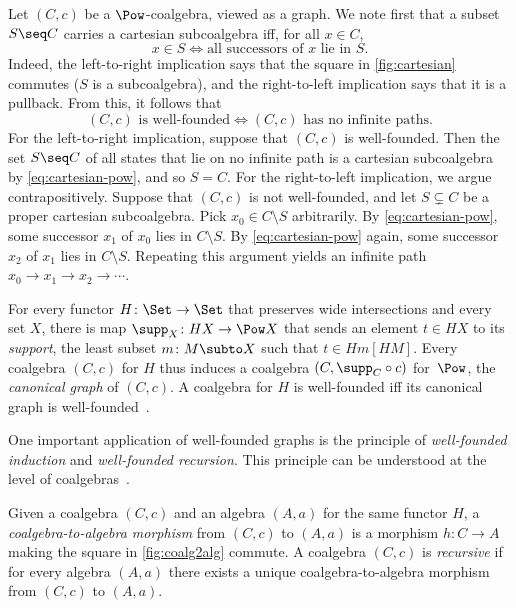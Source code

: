 \documentclass[a4paper,UKenglish, autoref, numberwithinsect, final]{lipics-v2021}
\numberwithin{equation}{section}
\theoremstyle{plain}
\theoremstyle{definition}
\begin{document}
\begin{example}[Graphs]\label{ex:wfCoalg}
Let $(C,c)$ be a $\Pow$-coalgebra, viewed as a graph. We note first that a subset $S\seq C$ carries a cartesian subcoalgebra iff, for all $x\in C$,
\begin{equation}\label{eq:cartesian-pow}
x\in S \iff \text{all successors of $x$ lie in $S$.}
\end{equation}
Indeed, the left-to-right implication says that the square in \autoref{fig:cartesian} commutes ($S$ is a subcoalgebra), and the right-to-left implication says that it is a pullback. From this, it follows that
\[ \text{$(C,c)$ is well-founded} \iff \text{$(C,c)$ has no infinite paths}. \]
 For the left-to-right implication, suppose that $(C,c)$ is well-founded. Then the set $S\seq C$ of all states that lie on no infinite path is a cartesian subcoalgebra by \eqref{eq:cartesian-pow}, and so $S=C$. For the right-to-left implication, we argue contrapositively. Suppose that $(C,c)$ is not well-founded, and let $S\subsetneq C$ be a proper cartesian subcoalgebra. Pick $x_0\in C\setminus S$ arbitrarily. By \eqref{eq:cartesian-pow}, some successor $x_1$ of $x_0$ lies in $C\setminus S$. By \eqref{eq:cartesian-pow} again, some successor $x_2$ of $x_1$ lies in $C\setminus S$. Repeating this argument yields an infinite path $x_0\to x_1\to x_2\to \cdots$.
\end{example}

\begin{example}
For every functor $H\colon \Set\to \Set$ that preserves wide intersections and every set $X$, there is map $\supp_X\colon HX\to \Pow X$ that sends an element $t\in HX$ to its \emph{support}, the least subset $m\colon M\subto X$ such that $t\in Hm[HM]$. Every coalgebra $(C,c)$ for $H$ thus induces a coalgebra $(C,\supp_C\circ c)$ for~$\Pow$, the \emph{canonical graph} of $(C,c)$. A coalgebra for $H$ is well-founded iff its canonical graph is well-founded~\cite[Rem.~6.3.4]{taylor99}.
\end{example}
One important application of well-founded graphs is the principle of \emph{well-founded induction} and \emph{well-founded recursion}. This principle can be understood at the level of coalgebras~\cite{taylor99}. 

Given a coalgebra $(C,c)$ and an algebra $(A,a)$ for the same functor $H$, a \emph{coalgebra-to-algebra morphism} from $(C,c)$ to $(A,a)$ is a morphism $h\colon C\to A$ making the square in \autoref{fig:coalg2alg} commute. A coalgebra $(C,c)$ is \emph{recursive} if for every algebra $(A,a)$ there exists a unique coalgebra-to-algebra morphism from $(C,c)$ to $(A,a)$.
\end{document}
